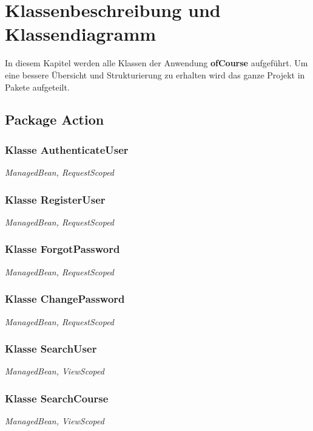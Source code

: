 	\newcommand{\class}[1]{\paragraph{Klasse #1:}\ \\ }
	\newcommand{\method}[1]{\textcolor{blue}{#1}}
	\newcommand{\kursiv}[1]{{\it #1}}
	\newcommand{\override}{{\it @Override}\ \\}
	
	\chapter{Klassenbeschreibung und Klassendiagramm}
	In diesem Kapitel werden alle Klassen der Anwendung \textbf{ofCourse} aufgeführt.
	Um eine bessere Übersicht und Strukturierung zu erhalten wird das ganze Projekt in Pakete aufgeteilt.
	
	\section{Package Action}
	
	\subsection{Klasse AuthenticateUser}
	\kursiv{ManagedBean, RequestScoped}\\
	\subsection{Klasse RegisterUser}
	\kursiv{ManagedBean, RequestScoped}\\
	\subsection{Klasse ForgotPassword}
	\kursiv{ManagedBean, RequestScoped}\\
	\subsection{Klasse ChangePassword}
	\kursiv{ManagedBean, RequestScoped}\\
	\subsection{Klasse SearchUser}
	\kursiv{ManagedBean, ViewScoped}\\
	\subsection{Klasse SearchCourse}
	\kursiv{ManagedBean, ViewScoped}\\
